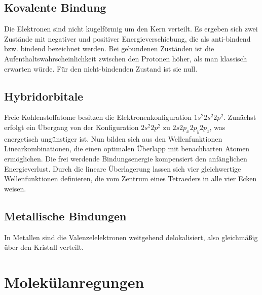 \documentclass[11pt]{article}
\begin{document}
\subsection{Kovalente Bindung}
Die Elektronen sind nicht kugelförmig um den Kern verteilt. Es ergeben sich
zwei Zustände mit negativer und positiver Energieverschiebung, die als
anti-bindend bzw. bindend bezeichnet werden. Bei gebundenen Zuständen ist die
Aufenthaltswahrscheinlichkeit zwischen den Protonen höher, als man klassisch
erwarten würde. Für den nicht-bindenden Zustand ist sie null.
\subsection{Hybridorbitale}
Freie Kohlenstoffatome besitzen die Elektronenkonfiguration $1s^2 2s^2 2p^2$.
Zunächst erfolgt ein Übergang von der Konfiguration $2s^2 2p^2$ zu $2s 2p_x 2p_y
 2p_z$, was energetisch ungünstiger ist. Nun bilden sich aus den
Wellenfunktionen Linearkombinationen, die einen optimalen Überlapp mit
benachbarten Atomen ermöglichen. Die frei werdende Bindungsenergie kompensiert
den anfänglichen Energieverlust. Durch die lineare Überlagerung lassen sich
vier gleichwertige Wellenfunktionen definieren, die vom Zentrum eines Tetraeders
in alle vier Ecken weisen.
\subsection{Metallische Bindungen}
In Metallen sind die Valenzelelektronen weitgehend delokalisiert, also
gleichmäßig über den Kristall verteilt.
\section{Molekülanregungen}
\end{document}
